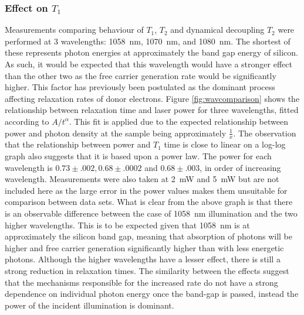 \subsubsection{Effect on $T_1$}

Measurements comparing behaviour of $T_1$, $T_2$ and dynamical decoupling $T_2$ were performed at 3 wavelengths: 1058~nm, 1070~nm, and 1080~nm.
The shortest of these represents photon energies at approximately the band gap energy of silicon.
As such, it would be expected that this wavelength would have a stronger effect than the other two as the free carrier generation rate would be significantly higher.
This factor has previously been postulated as the dominant process affecting relaxation rates of donor electrons.
Figure \ref{fig:wavcomparison} shows the relationship between relaxation time and laser power for three wavelengths, fitted according to $A/t^{\alpha}$.
This fit is applied due to the expected relationship between power and photon density at the sample being approximately $\frac{1}{x}$.
The observation that the relationship between power and $T_1$ time is close to linear on a log-log graph also suggests that it is based upon a power law.
The power for each wavelength is $0.73\pm.002, 0.68\pm.0002$ and $0.68\pm.003$, in order of increasing wavelength.
Measurements were also taken at 2~mW and 5~mW but are not included here as the large error in the power values makes them unsuitable for comparison between data sets.
What is clear from the above graph is that there is an observable difference between the case of 1058~nm illumination and the two higher wavelengths.
This is to be expected given that 1058~nm is at approximately the silicon band gap, meaning that absorption of photons will be higher and free carrier generation significantly higher than with less energetic photons.
Although the higher wavelengths have a lesser effect, there is still a strong reduction in relaxation times.
The similarity between the effects suggest that the mechanisms responsible for the increased rate do not have a strong dependence on individual photon energy once the band-gap is passed, instead the power of the incident illumination is dominant.

